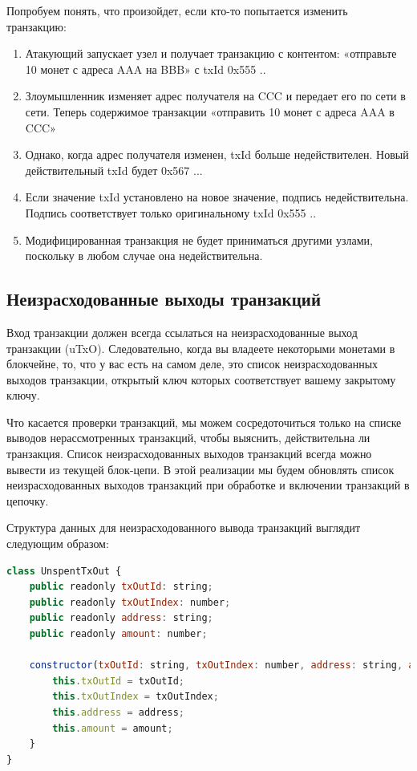 \documentclass{article}
\begin{document}
Попробуем понять, что произойдет, если кто-то попытается изменить транзакцию:

\begin{enumerate}
	\item  Атакующий запускает узел и получает транзакцию с контентом: «отправьте 10 монет с адреса AAA на BBB» с txId 0x555 ..
	\item Злоумышленник изменяет адрес получателя на CCC и передает его по сети в сети. Теперь содержимое транзакции «отправить 10 монет с адреса AAA в CCC»
	\item Однако, когда адрес получателя изменен, txId больше недействителен. Новый действительный txId будет 0x567 ...
	\item Если значение txId установлено на новое значение, подпись недействительна. Подпись соответствует только оригинальному txId 0x555 ..
	\item Модифицированная транзакция не будет приниматься другими узлами, поскольку в любом случае она недействительна.
\end{enumerate}

\subsection{Неизрасходованные выходы транзакций}

Вход транзакции должен всегда ссылаться на неизрасходованные выход транзакции (uTxO). Следовательно, когда вы владеете некоторыми монетами в блокчейне, то, что у вас есть на самом деле, это список неизрасходованных выходов транзакции, открытый ключ которых соответствует вашему закрытому ключу.

Что касается проверки транзакций, мы можем сосредоточиться только на списке выводов нерассмотренных транзакций, чтобы выяснить, действительна ли транзакция. Список неизрасходованных выходов транзакций всегда можно вывести из текущей блок-цепи. В этой реализации мы будем обновлять список неизрасходованных выходов транзакций при обработке и включении транзакций в цепочку.

Структура данных для неизрасходованного вывода транзакций выглядит следующим образом:

\begin{lstlisting}[language=JavaScript, caption={Класс неиспользованноых выходов.}]
class UnspentTxOut {
	public readonly txOutId: string;
	public readonly txOutIndex: number;
	public readonly address: string;
	public readonly amount: number;
	
	constructor(txOutId: string, txOutIndex: number, address: string, amount: number) {
		this.txOutId = txOutId;
		this.txOutIndex = txOutIndex;
		this.address = address;
		this.amount = amount;
	}
}
\end{lstlisting}
\end{document}
